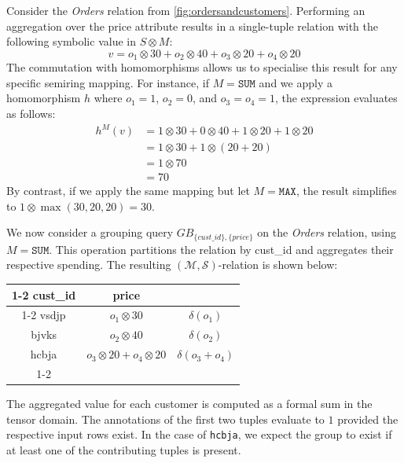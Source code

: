 \documentclass[oneside, 11pt]{amsbook}
\theoremstyle{plain}
\theoremstyle{definition}
\theoremstyle{remark}
\begin{document}
\begin{exmpl}
    Consider the \textit{Orders} relation from \autoref{fig:ordersandcustomers}. Performing an aggregation over the price attribute results in a single-tuple relation with the following symbolic value in $S \otimes M$:
    \[
        v = o_1 \otimes 30 + o_2 \otimes 40 + o_3 \otimes 20 + o_4 \otimes 20
    \]
    The commutation with homomorphisms allows us to specialise this result for any specific semiring mapping. For instance, if $M = \texttt{SUM}$ and we apply a homomorphism $h$ where $o_1 = 1$, $o_2 = 0$, and $o_3 = o_4 = 1$, the expression evaluates as follows:
    \begin{align*}
        h^M(v) & = 1 \otimes 30 + 0 \otimes 40 + 1 \otimes 20 + 1 \otimes 20 \\
               & = 1 \otimes 30 + 1 \otimes (20 + 20)                        \\
               & = 1 \otimes 70                                              \\
               & = 70
    \end{align*}
    By contrast, if we apply the same mapping but let $M = \texttt{MAX}$, the result simplifies to $1 \otimes \max(30, 20, 20) = 30$.
\end{exmpl}

\begin{exmpl}
    \label{ordersgrouping}
    We now consider a grouping query $GB_{\{cust\_id\}, \{price\}}$ on the \textit{Orders} relation, using $M = \texttt{SUM}$. This operation partitions the relation by cust\_id and aggregates their respective spending. The resulting $(\mathcal{M}, \mathcal{S})$-relation is shown below:
    \begin{center}
        \begin{tabular}{|c|c|c}
            \cline{1-2}
            cust\_id & price                             &                     \\ \cline{1-2}
            vsdjp    & $o_1 \otimes 30$                  & $\delta(o_1)$       \\
            bjvks    & $o_2 \otimes 40$                  & $\delta(o_2)$       \\
            hcbja    & $o_3 \otimes 20 + o_4 \otimes 20$ & $\delta(o_3 + o_4)$ \\ \cline{1-2}
        \end{tabular}
    \end{center}

    The aggregated value for each customer is computed as a formal sum in the tensor domain. The annotations of the first two tuples evaluate to $1$ provided the respective input rows exist. In the case of \texttt{hcbja}, we expect the group to exist if at least one of the contributing tuples is present.
\end{exmpl}
\end{document}
